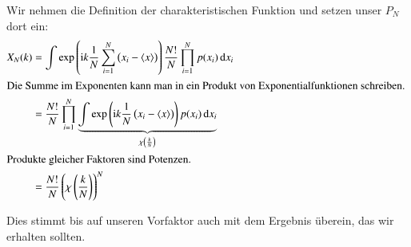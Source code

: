 Wir nehmen die Definition der charakteristischen Funktion und setzen unser
$P_N$ dort ein:
\begin{align*}
    X_N(k)
    &= \int \exp{\ii k \frac 1N \sum_{i=1}^N \del{x_i - \mw{x}}}
    \frac{N!}N \prod_{i=1}^N p(x_i) \dif x_i \\
    \intertext{%
        Die Summe im Exponenten kann man in ein Produkt von
        Exponentialfunktionen schreiben.
    }
    &= \frac{N!}N \prod_{i=1}^N \underbrace{\int 
        \exp{\ii k \frac 1N \del{x_i - \mw{x}}}
    p(x_i) \dif x_i}_{\chi\del{\frac kN}} \\
    \intertext{%
        Produkte gleicher Faktoren sind Potenzen.
    }
    &= \frac{N!}N \del{\chi\del{\frac kN}}^N
\end{align*}

Dies stimmt bis auf unseren Vorfaktor auch mit dem Ergebnis überein, das wir
erhalten sollten.



